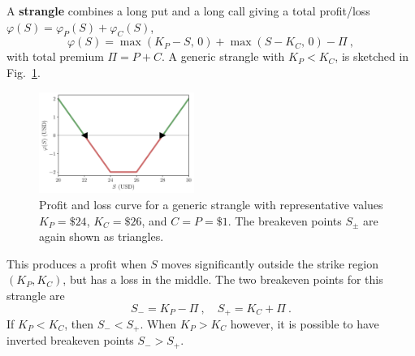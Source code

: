 \documentclass[aps,reprint]{revtex4-2}
\begin{document}
A \textbf{strangle} combines a long put and a long call giving a total profit/loss
$\varphi(S)= \varphi_P(S) + \varphi_C(S)$,
\begin{equation}
\varphi(S) = \max(K_P - S,\,0) + \max(S - K_C,\,0) - \Pi~,
\end{equation}
with total premium $\Pi = P + C$.  
A generic strangle with $K_P < K_C$, is sketched in Fig.~\ref{fig:strangle}.
\begin{figure}[hb]
    \centering
    \includegraphics[width=0.45\textwidth]{figs/strangle.pdf}
    \caption{Profit and loss curve for a generic strangle with representative values
    $K_P = \$24$, $K_C = \$26$, and $C = P = \$1$.
    The breakeven points $S_\pm$ are again shown as triangles.}
    \label{fig:strangle}
\end{figure}
This produces a profit when $S$ moves significantly outside the strike region $(K_P, K_C)$, but has a loss in the middle. 
The two breakeven points for this strangle are
\begin{equation}
S_{-} = K_P - \Pi~, 
\quad 
S_{+} = K_C + \Pi~.
\end{equation}
If $K_P < K_C$, then $S_{-} < S_{+}$.  When $K_P > K_C$ however, it is possible to have inverted breakeven points $S_{-} > S_{+}$.
\end{document}
